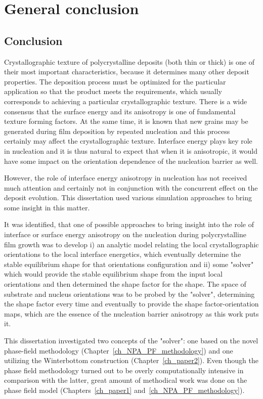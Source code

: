 \chapter{General conclusion} \label{ch_conclusion}
\section{Conclusion}
Crystallographic texture of polycrystalline deposits (both thin or thick) is one of their most important characteristics, because it determines many other deposit properties. The deposition process must be optimized for the particular application so that the product meets the requirements, which usually corresponds to achieving a particular crystallographic texture. There is a wide consensus that the surface energy and its anisotropy is one of fundamental texture forming factors. At the same time, it is known that new grains may be generated during film deposition by repeated nucleation and this process certainly may affect the crystallographic texture. Interface energy plays key role in nucleation and it is thus natural to expect that when it is anisotropic, it would have some impact on the orientation dependence of the nucleation barrier as well. 

However, the role of interface energy anisotropy in nucleation has not received much attention and certainly not in conjunction with the concurrent effect on the deposit evolution. This dissertation used various simulation approaches to bring some insight in this matter.

It was identified, that one of possible approaches to bring insight into the role of interface or surface energy anisotropy on the nucleation during polycrystalline film growth was to develop i) an analytic model relating the local crystallographic orientations to the local interface energetics, which eventually determine the stable equilibrium shape for that orientations configuration and ii) some "solver" which would provide the stable equilibrium shape from the input local orientations and then determined the shape factor for the shape. The space of substrate and nucleus orientations was to be probed by the "solver", determining the shape factor every time and eventually to provide the shape factor-orientation maps, which are the essence of the nucleation barrier anisotropy as this work puts it.

This dissertation investigated two concepts of the "solver": one based on the novel phase-field methodology (Chapter~\ref{ch_NPA_PF_methodology}) and one utilizing the Winterbottom construction (Chapter~\ref{ch_paper2}). Even though the phase field methodology turned out to be overly computationally intensive in comparison with the latter, great amount of methodical work was done on the phase field model (Chapters~\ref{ch_paper1} and~\ref{ch_NPA_PF_methodology}). 

